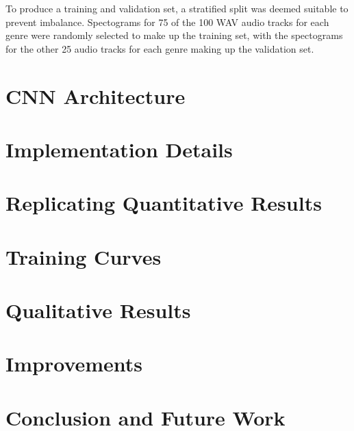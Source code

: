 \documentclass[conference]{IEEEtran}
\begin{document}
To produce a training and validation set, a stratified split was deemed suitable to prevent imbalance.
Spectograms for 75 of the 100 WAV audio tracks for each genre were randomly selected to make up the training set, with the spectograms for the other 25 audio tracks for each genre making up the validation set.

\section{CNN Architecture}

\section{Implementation Details}

\section{Replicating Quantitative Results}

\section{Training Curves}

\section{Qualitative Results}

\section{Improvements}

\section{Conclusion and Future Work}





\end{document}
